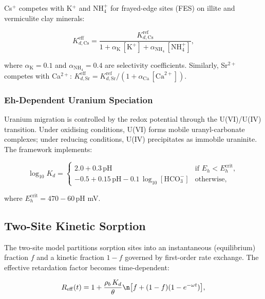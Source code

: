 \documentclass[a4paper,11pt]{article}
\begin{document}
Cs$^+$ competes with K$^+$ and NH$_4^+$ for frayed-edge sites (FES) on
illite and vermiculite clay minerals:

\begin{equation}
  K_{d,\mathrm{Cs}}^{\mathrm{eff}} = \frac{K_{d,\mathrm{Cs}}^{\mathrm{ref}}}{1 + \alpha_{\mathrm{K}}\,[\mathrm{K}^+] + \alpha_{\mathrm{NH}_4}\,[\mathrm{NH}_4^+]},
\end{equation}

where $\alpha_{\mathrm{K}} = 0.1$ and $\alpha_{\mathrm{NH}_4} = 0.4$ are
selectivity coefficients.  Similarly, Sr$^{2+}$ competes with
Ca$^{2+}$: $K_{d,\mathrm{Sr}}^{\mathrm{eff}} = K_{d,\mathrm{Sr}}^{\mathrm{ref}} / (1 + \alpha_{\mathrm{Ca}}\,[\mathrm{Ca}^{2+}])$.

\subsubsection{Eh-Dependent Uranium Speciation}

Uranium migration is controlled by the redox potential through the
U(VI)/U(IV) transition.  Under oxidising conditions, U(VI) forms
mobile uranyl-carbonate complexes; under reducing conditions, U(IV)
precipitates as immobile uraninite.  The framework implements:

\begin{equation}
  \log_{10} K_d = \begin{cases}
    2.0 + 0.3\,\mathrm{pH}  & \text{if } E_h < E_h^{\mathrm{crit}}, \\
    -0.5 + 0.15\,\mathrm{pH} - 0.1\,\log_{10}[\mathrm{HCO}_3^-] & \text{otherwise,}
  \end{cases}
\end{equation}

where $E_h^{\mathrm{crit}} = 470 - 60\,\mathrm{pH}$ mV.

\subsection{Two-Site Kinetic Sorption}

The two-site model \citep{vangenuchten1989two} partitions sorption
sites into an instantaneous (equilibrium) fraction $f$ and a kinetic
fraction $1 - f$ governed by first-order rate exchange.  The effective
retardation factor becomes time-dependent:

\begin{equation}
  R_{\mathrm{eff}}(t) = 1 + \frac{\rho_b\,K_d}{\theta}\n    \bigl[f + (1-f)(1 - e^{-\omega t})\bigr],
\end{equation}
\end{document}
